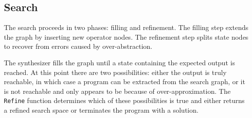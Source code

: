 \documentclass[authordraft,acmsmall,10pt]{acmart}
\begin{document}
\subsection{Search}

The search proceeds in two phases: filling and refinement. The filling step
extends the graph by inserting new operator nodes. The refinement step splits
state nodes to recover from errors caused by over-abstraction.

The synthesizer fills the graph until a state containing the expected output is
reached. At this point there are two possibilities: either the output is truly
reachable, in which case a program can be extracted from the search graph, or it
is not reachable and only appears to be because of over-approximation. The
\texttt{Refine} function determines which of these possibilities is true and
either returns a refined search space or terminates the program with a solution.
\end{document}

